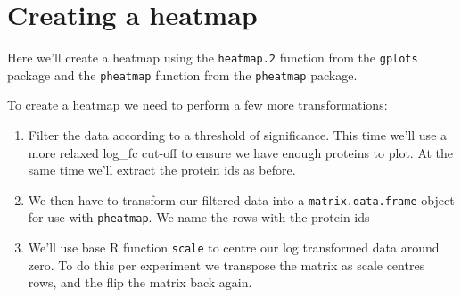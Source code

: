\documentclass[12pt,]{book}
\newenvironment{Shaded}{\begin{snugshade}}{\end{snugshade}}
\newcommand{\KeywordTok}[1]{\textcolor[rgb]{0.13,0.29,0.53}{\textbf{#1}}}
\newcommand{\DataTypeTok}[1]{\textcolor[rgb]{0.13,0.29,0.53}{#1}}
\newcommand{\DecValTok}[1]{\textcolor[rgb]{0.00,0.00,0.81}{#1}}
\newcommand{\FloatTok}[1]{\textcolor[rgb]{0.00,0.00,0.81}{#1}}
\newcommand{\StringTok}[1]{\textcolor[rgb]{0.31,0.60,0.02}{#1}}
\newcommand{\CommentTok}[1]{\textcolor[rgb]{0.56,0.35,0.01}{\textit{#1}}}
\newcommand{\OperatorTok}[1]{\textcolor[rgb]{0.81,0.36,0.00}{\textbf{#1}}}
\newcommand{\NormalTok}[1]{#1}
\theoremstyle{definition}
\theoremstyle{definition}
\theoremstyle{definition}
\theoremstyle{remark}
\begin{document}
\section{Creating a heatmap}\label{creating-a-heatmap}

Here we'll create a heatmap using the \texttt{heatmap.2} function from
the \texttt{gplots} package and the \texttt{pheatmap} function from the
\texttt{pheatmap} package.

To create a heatmap we need to perform a few more transformations:

\begin{enumerate}
\def\labelenumi{\arabic{enumi}.}
\item
  Filter the data according to a threshold of significance. This time
  we'll use a more relaxed log\_fc cut-off to ensure we have enough
  proteins to plot. At the same time we'll extract the protein ids as
  before.
\item
  We then have to transform our filtered data into a
  \texttt{matrix.data.frame} object for use with \texttt{pheatmap}. We
  name the rows with the protein ids
\item
  We'll use base R function \texttt{scale} to centre our log transformed
  data around zero. To do this per experiment we transpose the matrix as
  scale centres rows, and the flip the matrix back again.
\end{enumerate}

\begin{Shaded}
\end{Shaded}
\end{document}
